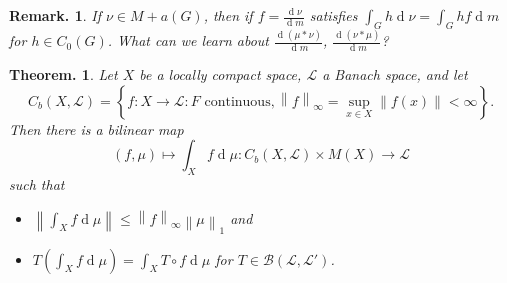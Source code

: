 \documentclass[11pt, a4paper]{memoir}
\newcommand{\norm}[1]{\ensuremath{\left\lVert#1\right\rVert}}
\theoremstyle{change}
\newtheorem{theorem}{Theorem.}[section]
\theoremstyle{plain}
\theoremstyle{nonumberplain}
\newtheorem{remark}{Remark.}
\renewcommand{\d}[1]{\ensuremath{\operatorname{d}\!{#1}}}
\numberwithin{equation}{section}
\begin{document}
\begin{remark}
    If $\nu\in M+a(G)$, then if $f=\frac{\d{\nu}}{\d{m}}$ satisfies $\int_G h\d{\nu}=\int_G hf\d{m}$ for $h\in C_0(G)$.
    What can we learn about $\frac{\d{(\mu*\nu)}}{\d{m}}$, $\frac{\d{(\nu*\mu)}}{\d{m}}$?
\end{remark}
\begin{theorem}
    Let $X$ be a locally compact space, $\mathcal{L}$ a Banach space, and let
    \begin{equation*}
        C_b(X,\mathcal{L}) =\left\{f:X\to\mathcal{L}:F\text{ continuous},\norm{f}_\infty=\sup_{x\in X}\norm{f(x)}<\infty\right\}.
    \end{equation*}
    Then there is a bilinear map
    \begin{equation*}
        (f,\mu)\mapsto\int_X f\d{\mu}:C_b(X,\mathcal{L})\times M(X)\to\mathcal{L}
    \end{equation*}
    such that
    \begin{itemize}[nl]
        \item $\norm{\int_X f\d{\mu}}\leq\norm{f}_\infty\norm{\mu}_1$ and
        \item $T\left(\int_X f\d{\mu}\right)=\int_X T\circ f\d{\mu}$ for $T\in\mathcal{B}(\mathcal{L},\mathcal{L}')$.
    \end{itemize}
\end{theorem}
\end{document}
